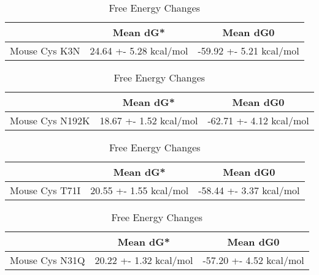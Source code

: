             \begin{table}[ht]
              \centering
              \begin{tabular}{|c|c|c|}
              \hline
                & Mean dG* & Mean dG0 \\
              \hline
      Mouse Cys K3N & 24.64 +- 5.28 kcal/mol & -59.92 +- 5.21 kcal/mol \\
              \hline
              \end{tabular}
              \caption{Free Energy Changes}
              \end{table}
              
            
          
              \begin{table}[ht]
                \centering
                \begin{tabular}{|c|c|c|}
                \hline
                  & Mean dG* & Mean dG0 \\
                \hline
      Mouse Cys N192K & 18.67 +- 1.52 kcal/mol & -62.71 +- 4.12 kcal/mol \\
                \hline
                \end{tabular}
                \caption{Free Energy Changes}
                \end{table}
                     

                \begin{table}[ht]
                  \centering
                  \begin{tabular}{|c|c|c|}
                  \hline
                    & Mean dG* & Mean dG0 \\
                  \hline
       Mouse Cys T71I & 20.55 +- 1.55 kcal/mol & -58.44 +- 3.37 kcal/mol \\
                  \hline
                  \end{tabular}
                  \caption{Free Energy Changes}
                  \end{table}



                  \begin{table}[ht]
                    \centering
                    \begin{tabular}{|c|c|c|}
                    \hline
                      & Mean dG* & Mean dG0 \\
                    \hline
              Mouse Cys N31Q & 20.22 +- 1.32 kcal/mol & -57.20 +- 4.52 kcal/mol \\
                    \hline
                    \end{tabular}
                    \caption{Free Energy Changes}
                    \end{table}


